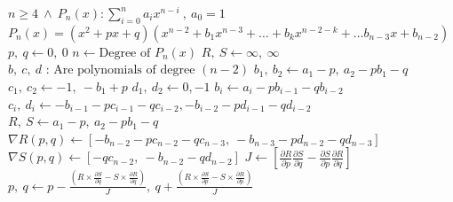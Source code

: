 \documentclass[11pt, spanish]{article}
\begin{document}
\begin{algorithm}[h]
\caption{}
\label{alg:bairstow}
\begin{algorithmic}[1]
\Require $n \geq 4\ \wedge\ P_n(x) : \sum_{i = 0}^{n} a_ix^{n - i}\ ,\ a_0 = 1$
\Ensure $P_n(x) = (x^2 + px + q)(x^{n - 2} + b_{1}x^{n - 3}  + \dots + b_{k}x^{n-2-k} + \dots b_{n-3}x + b_{n-2})$
\State $p,\ q \gets 0,\ 0$
\State $n \gets \text{Degree of } P_n(x)$
\State $R,\ S \gets \infty,\ \infty$
\State $b,\ c,\ d \text{ : Are polynomials of degree } (n - 2)$
\State $b_1,\ b_2 \gets a_{1} - p,\ a_{2} - p b_{1} - q$
\State $c_1,\ c_2 \gets -1,\ -b_1 + p$
\State $d_1,\ d_2 \gets 0, -1$
\State $b_i \gets a_{i} - p b_{i - 1} - qb_{i - 2}$
\State $c_i,\ d_i \gets  -b_{i-1} - p c_{i-1} - q c_{i-2}, -b_{i-2} - p d_{i-1} - q d_{i-2}$
\EndFor
\State $R,\ S \gets a_{1} - p,\ a_{2} - p b_{1} - q$
\State $\nabla R(p, q) \gets \left[-b_{n-2} - p c_{n-2} - qc_{n-3},\ -b_{n-3} - pd_{n-2}-qd_{n-3}\right]$
\State $\nabla S(p, q) \gets \left[-qc_{n-2},\ -b_{n-2}-q d_{n-2}\right]$
\State $J \gets \left[\frac{\partial R}{\partial p} \frac{\partial S}{\partial q} - \frac{\partial S}{\partial p} \frac{\partial R}{\partial q}\right]$
\State $p,\ q \gets p - \frac{\left( R \times \frac{\partial S}{\partial q} - S \times \frac{\partial R}{\partial q}\right)}{J},\ q + \frac{\left( R \times \frac{\partial S}{\partial p} - S \times \frac{\partial R}{\partial p}\right)}{J}$
\EndWhile
{}
\EndProcedure
\end{algorithmic}
\end{algorithm}
\end{document}
